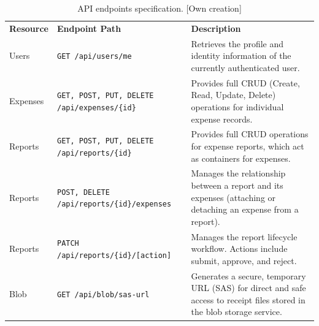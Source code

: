 \begin{table}[H]
    \centering  
    \footnotesize
    \renewcommand{\arraystretch}{1.2}
    \setlength{\arrayrulewidth}{0.8pt}
    \begin{tabularx}{\textwidth}{>{\centering\arraybackslash}p{1.6cm} >{\centering\arraybackslash}p{4.75cm} X}
        \rowcolor{gray!40} 
        \textbf{Resource} & \textbf{Endpoint Path} & \parbox[c][\height][c]{\hsize}{\centering \textbf{Description}} \\
        
        Users & \texttt{GET /api/users/me} & Retrieves the profile and identity information of the currently authenticated user. \\
        
        Expenses & \texttt{GET, POST, PUT, DELETE /api/expenses/\{id\}} & Provides full CRUD (Create, Read, Update, Delete) operations for individual expense records. \\
        
        Reports & \texttt{GET, POST, PUT, DELETE /api/reports/\{id\}} & Provides full CRUD operations for expense reports, which act as containers for expenses. \\
        
        Reports & \texttt{POST, DELETE /api/reports/\{id\}/expenses} & Manages the relationship between a report and its expenses (attaching or detaching an expense from a report). \\ 
        
        Reports & \texttt{PATCH /api/reports/\{id\}/[action]} & Manages the report lifecycle workflow. Actions include submit, approve, and reject. \\
        
        Blob & \texttt{GET /api/blob/sas-url} & Generates a secure, temporary URL (SAS) for direct and safe access to receipt files stored in the blob storage service. \\
    \end{tabularx}
    \caption[API endpoints specification]
    {API endpoints specification. [Own creation]}
    \vspace{-1em}
    \label{table:api-endpoints} 
\end{table}